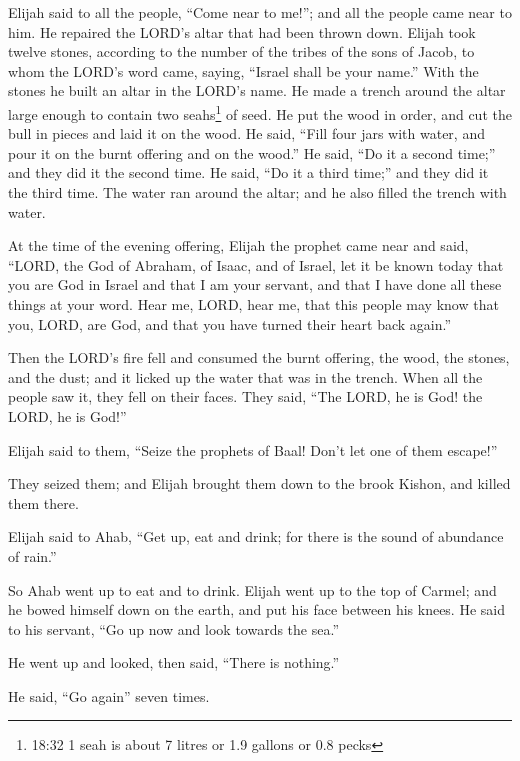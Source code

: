  Elijah said to all the people, ``Come near to me!''; and
all the people came near to him. He repaired the LORD's altar that had
been thrown down.  Elijah took twelve stones, according to
the number of the tribes of the sons of Jacob, to whom the LORD's word
came, saying, ``Israel shall be your name.''  With the
stones he built an altar in the LORD's name. He made a trench around the
altar large enough to contain two seahs\footnote{18:32 1 seah is about 7
  litres or 1.9 gallons or 0.8 pecks} of seed.  He put the
wood in order, and cut the bull in pieces and laid it on the wood. He
said, ``Fill four jars with water, and pour it on the burnt offering and
on the wood.''  He said, ``Do it a second time;'' and they
did it the second time. He said, ``Do it a third time;'' and they did it
the third time.  The water ran around the altar; and he
also filled the trench with water.

 At the time of the evening offering, Elijah the prophet
came near and said, ``LORD, the God of Abraham, of Isaac, and of Israel,
let it be known today that you are God in Israel and that I am your
servant, and that I have done all these things at your word.
 Hear me, LORD, hear me, that this people may know that
you, LORD, are God, and that you have turned their heart back again.''

 Then the LORD's fire fell and consumed the burnt offering,
the wood, the stones, and the dust; and it licked up the water that was
in the trench.  When all the people saw it, they fell on
their faces. They said, ``The LORD, he is God! the LORD, he is God!''

 Elijah said to them, ``Seize the prophets of Baal! Don't
let one of them escape!''

They seized them; and Elijah brought them down to the brook Kishon, and
killed them there.

 Elijah said to Ahab, ``Get up, eat and drink; for there is
the sound of abundance of rain.''

 So Ahab went up to eat and to drink. Elijah went up to the
top of Carmel; and he bowed himself down on the earth, and put his face
between his knees.  He said to his servant, ``Go up now and
look towards the sea.''

He went up and looked, then said, ``There is nothing.''

He said, ``Go again'' seven times.


